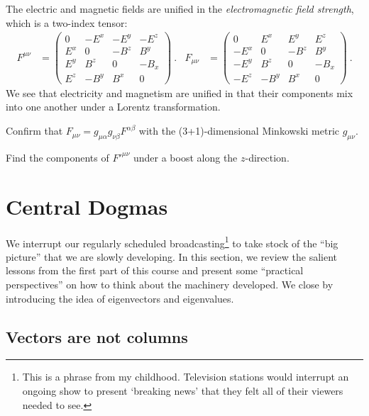 \documentclass[12pt]{article}
\begin{document}
The electric and magnetic fields are unified in the \emph{electromagnetic field strength}, which is a two-index tensor:
\begin{align}
    F^{\mu\nu}
    &=
    \begin{pmatrix}
        0&-E^x&-E^y&-E^z\\
        E^x&0&-B^z&B^y\\
        E^y&B^z&0&-B_x\\
        E^z&-B^y&B^x&0
    \end{pmatrix} \ .
    &
    F_{\mu\nu}
    &=
    \begin{pmatrix}
        0&E^x&E^y&E^z\\
        -E^x&0&-B^z&B^y\\
        -E^y&B^z&0&-B_x\\
        -E^z&-B^y&B^x&0
    \end{pmatrix} \ .
\end{align}
We see that electricity and magnetism are unified in that their components mix into one another under a Lorentz transformation. 
\begin{exercise}
Confirm that $F_{\mu\nu} =g_{\mu \alpha}g_{\nu\beta} F^{\alpha\beta}$ with the (3+1)-dimensional Minkowski metric $g_{\mu\nu}$. 
\end{exercise}
\begin{exercise}
Find the components of $F'^{\mu\nu}$ under a boost along the $z$-direction. 
\end{exercise}


\section{Central Dogmas}

We interrupt our regularly scheduled broadcasting\footnote{This is a phrase from my childhood. Television stations would interrupt an ongoing show to present `breaking news' that they felt all of their viewers needed to see.} to take stock of the ``big picture'' that we are slowly developing. In this section, we review the salient lessons from the first part of this course and present some ``practical perspectives'' on how to think about the machinery developed. We close by introducing the idea of eigenvectors and eigenvalues.

\subsection{Vectors are not columns}
\end{document}
